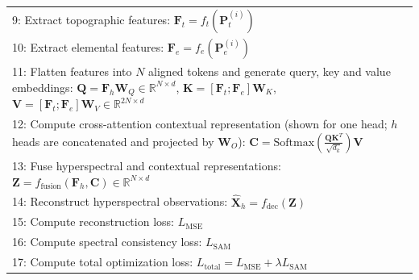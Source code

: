 \documentclass[pdflatex,sn-mathphys-num]{sn-jnl}
\begin{document}
\begin{table}[!t]
\begin{tabular}{p{}}
\\

9: \hspace{1cm} Extract topographic features:
$\mathbf{F}_t=f_t(\mathbf{P}_t^{(i)})$

\\

10: \hspace{1cm} Extract elemental features:
$\mathbf{F}_e=f_e(\mathbf{P}_e^{(i)})$

\\

11: \hspace{1cm} Flatten features into $N$ aligned tokens and generate query, key and value embeddings:
$\mathbf{Q}=\mathbf{F}_h\mathbf{W}_Q\in\mathbb{R}^{N\times d}$,
$\mathbf{K}=[\mathbf{F}_t;\mathbf{F}_e]\mathbf{W}_K$,
$\mathbf{V}=[\mathbf{F}_t;\mathbf{F}_e]\mathbf{W}_V\in\mathbb{R}^{2N\times d}$

\\

12: \hspace{1cm} Compute cross-attention contextual representation (shown for one head; $h$ heads are concatenated and projected by $\mathbf{W}_O$):
$\mathbf{C}
=
\mathrm{Softmax}
\left(
\frac{\mathbf{Q}\mathbf{K}^{T}}
{\sqrt{d_k}}
\right)\mathbf{V}$

\\

13: \hspace{1cm} Fuse hyperspectral and contextual representations:
$\mathbf{Z}=f_{\mathrm{fusion}}(\mathbf{F}_h,\mathbf{C})\in\mathbb{R}^{N\times d}$

\\

14: \hspace{1cm} Reconstruct hyperspectral observations:
$\hat{\mathbf{X}}_{h}=f_{\mathrm{dec}}(\mathbf{Z})$

\\

15: \hspace{1cm} Compute reconstruction loss:
$L_{\mathrm{MSE}}$

\\

16: \hspace{1cm} Compute spectral consistency loss:
$L_{\mathrm{SAM}}$

\\

17: \hspace{1cm} Compute total optimization loss:
$L_{\mathrm{total}}
=
L_{\mathrm{MSE}}
+
\lambda L_{\mathrm{SAM}}$


\end{tabular}
\end{table}
\end{document}
